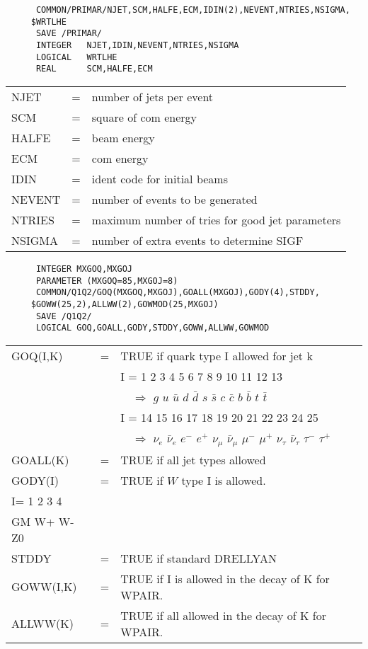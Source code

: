 \begin{verbatim}
      COMMON/PRIMAR/NJET,SCM,HALFE,ECM,IDIN(2),NEVENT,NTRIES,NSIGMA,
     $WRTLHE
      SAVE /PRIMAR/
      INTEGER   NJET,IDIN,NEVENT,NTRIES,NSIGMA
      LOGICAL   WRTLHE
      REAL      SCM,HALFE,ECM
\end{verbatim}
\begin{tabular}{lcl}
NJET               &=& number of jets per event\\
SCM                &=& square of com energy\\
HALFE              &=& beam energy\\
ECM                &=& com energy\\
IDIN               &=& ident code for initial beams\\
NEVENT             &=& number of events to be generated\\
NTRIES             &=& maximum number of tries for good jet parameters\\
NSIGMA             &=& number of extra events to determine SIGF\\
\end{tabular}

\begin{verbatim}
      INTEGER MXGOQ,MXGOJ
      PARAMETER (MXGOQ=85,MXGOJ=8)
      COMMON/Q1Q2/GOQ(MXGOQ,MXGOJ),GOALL(MXGOJ),GODY(4),STDDY,
     $GOWW(25,2),ALLWW(2),GOWMOD(25,MXGOJ)
      SAVE /Q1Q2/
      LOGICAL GOQ,GOALL,GODY,STDDY,GOWW,ALLWW,GOWMOD
\end{verbatim}
\begin{tabular}{lcl}
GOQ(I,K)           &=& TRUE if quark type I allowed for jet k\\
                   && I = 1  2  3  4  5  6  7  8  9 10 11 12 13\\
                   && \ \ $\Rightarrow$ $g$ $u$ $\bar u$ $d$ $\bar d$ $s$ 
                      $\bar s$ $c$ $\bar c$ $b$ $\bar b$ $t$ $\bar t$\\
                   && I = 14   15 16 17  18   19  20  21  22   23   24   25\\
                   && \ \ $\Rightarrow$ $\nu_e$ $\bar\nu_e$ $e^-$ $e^+$ 
                      $\nu_\mu$ $\bar\nu_\mu$ $\mu^-$ $\mu^+$ $\nu_\tau$ 
                      $\bar\nu_\tau$ $\tau^-$ $\tau^+$\\
GOALL(K)           &=& TRUE if all jet types allowed\\
GODY(I)            &=& TRUE if $W$ type I is allowed.\\
                    I= 1  2  3  4\\
                      GM W+ W- Z0\\
STDDY              &=& TRUE if standard DRELLYAN\\
GOWW(I,K)          &=& TRUE if I is allowed in the decay of K for WPAIR.\\
ALLWW(K)           &=& TRUE if all allowed in the decay of K for WPAIR.\\
\end{tabular}

